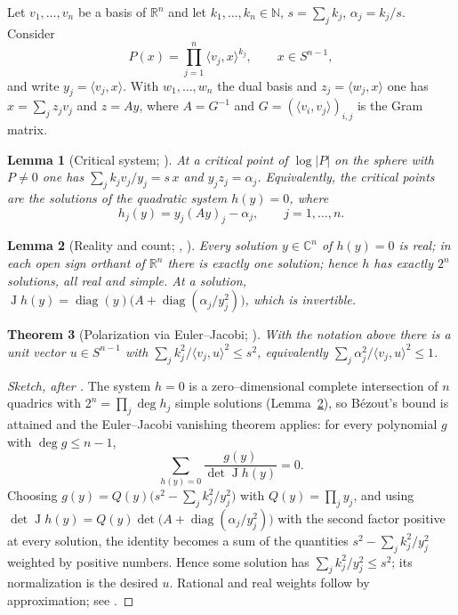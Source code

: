 \documentclass[11pt,reqno]{amsart}
\theoremstyle{plain}
\newtheorem{theorem}{Theorem}[section]
\newtheorem{lemma}[theorem]{Lemma}
\theoremstyle{definition}
\newcommand{\R}{\mathbb{R}}
\newcommand{\C}{\mathbb{C}}
\newcommand{\N}{\mathbb{N}}
\newcommand{\inner}[2]{\langle #1, #2\rangle}
\newcommand{\abs}[1]{\lvert #1\rvert}
\newcommand{\diag}{\operatorname{diag}}
\newcommand{\Jac}{\operatorname{J}}
\begin{document}
Let $v_1,\dots,v_n$ be a basis of $\R^n$ and let $k_1,\dots,k_n\in\N$,
$s=\sum_j k_j$, $\alpha_j=k_j/s$. Consider
\[
P(x)=\prod_{j=1}^{n}\inner{v_j}{x}^{k_j}, \qquad x\in S^{n-1},
\]
and write $y_j=\inner{v_j}{x}$. With $w_1,\dots,w_n$ the dual basis and
$z_j=\inner{w_j}{x}$ one has $x=\sum_j z_j v_j$ and $z=Ay$, where $A=G^{-1}$ and
$G=(\inner{v_i}{v_j})_{i,j}$ is the Gram matrix.

\begin{lemma}[Critical system; \cite{MartinezOrtegaMoreno2026,GalicerOrtegaPinasco2026}]
\label{lem:critsystem}
At a critical point of $\log\abs{P}$ on the sphere with $P\neq0$ one has
$\sum_j k_j v_j/y_j=s\,x$ and $y_j z_j=\alpha_j$. Equivalently, the critical
points are the solutions of the quadratic system $h(y)=0$, where
\[
h_j(y)=y_j (Ay)_j-\alpha_j,\qquad j=1,\dots,n .
\]
\end{lemma}

\begin{lemma}[Reality and count;
{\cite[Lem.~3--4]{GalicerOrtegaPinasco2026}},
{\cite{MartinezOrtegaMoreno2026}}]\label{lem:realcount}
Every solution $y\in\C^n$ of $h(y)=0$ is real; in each open sign orthant of
$\R^n$ there is exactly one solution; hence $h$ has exactly $2^n$ solutions, all
real and simple. At a solution,
$\Jac h(y)=\diag(y)\big(A+\diag(\alpha_j/y_j^2)\big)$, which is invertible.
\end{lemma}

\begin{theorem}[Polarization via Euler--Jacobi;
{\cite{MartinezOrtegaMoreno2026,GalicerOrtegaPinasco2026}}]\label{thm:euler}
With the notation above there is a unit vector $u\in S^{n-1}$ with
$\sum_j k_j^2/\inner{v_j}{u}^2\le s^2$, equivalently
$\sum_j \alpha_j^2/\inner{v_j}{u}^2\le 1$.
\end{theorem}

\begin{proof}[Sketch, after {\cite{GalicerOrtegaPinasco2026}}]
The system $h=0$ is a zero--dimensional complete intersection of $n$ quadrics with
$2^n=\prod_j\deg h_j$ simple solutions (Lemma~\ref{lem:realcount}), so B\'ezout's
bound is attained and the Euler--Jacobi vanishing theorem applies: for every
polynomial $g$ with $\deg g\le n-1$,
\[
\sum_{h(y)=0}\frac{g(y)}{\det \Jac h(y)}=0 .
\]
Choosing $g(y)=Q(y)\big(s^2-\sum_j k_j^2/y_j^2\big)$ with $Q(y)=\prod_j y_j$, and
using $\det \Jac h(y)=Q(y)\det\!\big(A+\diag(\alpha_j/y_j^2)\big)$ with the second
factor positive at every solution, the identity becomes a sum of the quantities
$s^2-\sum_j k_j^2/y_j^2$ weighted by positive numbers. Hence some solution has
$\sum_j k_j^2/y_j^2\le s^2$; its normalization is the desired $u$. Rational and
real weights follow by approximation; see
\cite{GalicerOrtegaPinasco2026}.
\end{proof}
\end{document}
